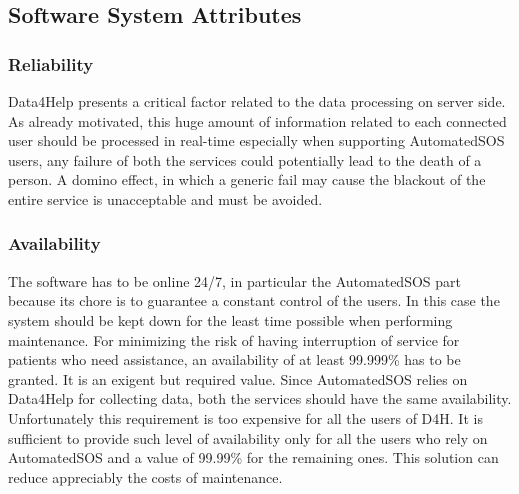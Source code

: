 \newpage
{\color{Blue}\subsection{Software System Attributes}}
{\color{Blue}\subsubsection{Reliability}}
Data4Help presents a critical factor related to the data processing on server side. As already motivated, this huge amount of information related to each connected user should be processed in real-time especially when supporting AutomatedSOS users, any failure of both the services could potentially lead to the death of a person. A domino effect, in which a generic fail may cause the blackout of the entire service is unacceptable and must be avoided.
\paragraph{}

{\color{Blue}\subsubsection{Availability}}
The software has to be online 24/7, in particular the AutomatedSOS part because its chore is to guarantee a constant control of the users. In this case the system should be kept down for the least time possible when performing maintenance. For minimizing the risk of having interruption of service for patients who need assistance, an availability of at least 99.999\% has to be granted. It is an exigent but required value. Since AutomatedSOS relies on Data4Help for collecting data, both the services should have the same availability. Unfortunately this requirement is too expensive for all the users of D4H. It is sufficient to provide such level of availability only for all the users who rely on AutomatedSOS and a value of 99.99\% for the remaining ones. This solution can reduce appreciably the costs of maintenance.
